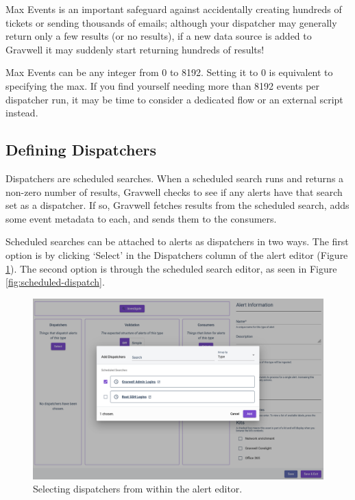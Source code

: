 Max Events is an important safeguard against accidentally creating hundreds of tickets or sending thousands of emails; although your dispatcher may generally return only a few results (or no results), if a new data source is added to Gravwell it may suddenly start returning hundreds of results!

Max Events can be any integer from 0 to 8192. Setting it to 0 is equivalent to specifying the max. If you find yourself needing more than 8192 events per dispatcher run, it may be time to consider a dedicated flow or an external script instead.

\subsection{Defining Dispatchers}
Dispatchers are scheduled searches. When a scheduled search runs and returns a non-zero number of results, Gravwell checks to see if any alerts have that search set as a dispatcher. If so, Gravwell fetches results from the scheduled search, adds some event metadata to each, and sends them to the consumers.

Scheduled searches can be attached to alerts as dispatchers in two ways. The first option is by clicking `Select' in the Dispatchers column of the alert editor (Figure \ref{fig:dispatchers-select}). The second option is through the scheduled search editor, as seen in Figure \ref{fig:scheduled-dispatch}.

\begin{figure}
	\includegraphics[width=0.85\linewidth]{images/dispatchers-select.png}
	\caption{Selecting dispatchers from within the alert editor.}
	\label{fig:dispatchers-select}
\end{figure}

